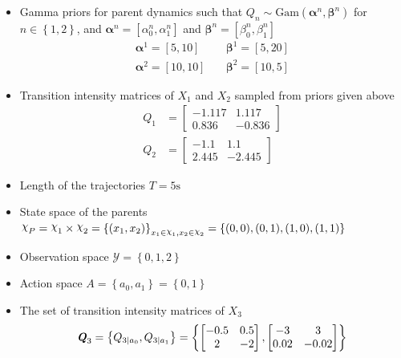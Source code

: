 \begin{itemize}
	\item Gamma priors for parent dynamics such that $ Q_{n} \sim \mathrm{Gam}(\boldsymbol{\alpha}^n, \boldsymbol{\beta}^n)$ for $n \in \left\lbrace 1,2\right\rbrace $, and $ \boldsymbol{\alpha}^n = [\alpha^n_0, \alpha^n_1] $ and $ \boldsymbol{\beta}^n = [\beta^n_0, \beta^n_1] $
	\begin{align}
	\boldsymbol{\alpha}^1 = [5,10] &\quad \boldsymbol{\beta}^1 = [5,20] \\
	\boldsymbol{\alpha}^2 = [10,10] &\quad \boldsymbol{\beta}^2 = [10,5]
	\label{eq:gamma_params}
	\end{align}
	\item Transition intensity matrices of $ X_1 $ and $ X_2 $ sampled from priors given above
	\begin{align}
	Q_1 &= 
	\begin{bmatrix}
	-1.117 & 1.117 \\
	0.836 &  -0.836
	\end{bmatrix} \\
	Q_2 &= 
	\begin{bmatrix}
	-1.1 & 1.1 \\
	2.445 &  -2.445
	\end{bmatrix}
	\end{align}
	\item Length of the trajectories $ T = 5\text{s} $
	\item State space of the parents $ \rchi_{P} = \rchi_1 \times \rchi_2 = \left\lbrace (x_1, x_2)\right\rbrace_{x_1\in \rchi_1, x_2\in \rchi_2} = \left\lbrace (0, 0), (0, 1), (1, 0),(1, 1)\right\rbrace $
	\item Observation space $ \mathcal{Y} = \left\lbrace 0, 1, 2 \right\rbrace $
	\item Action space $ \textit{A} = \left\lbrace a_{0}, a_{1} \right\rbrace = \left\lbrace 0, 1\right\rbrace $
	\item The set of transition intensity matrices of $ X_3 $
	\begin{align}
	\textbf{\textit{Q}}_3 = \left\lbrace Q_{3\mid a_{0}}, Q_{3\mid a_{1}} \right\rbrace = \left\lbrace 
	\begin{bmatrix}
	-0.5 & 0.5 \\
	2 &  -2
	\end{bmatrix}, 
	\begin{bmatrix}
	-3 & 3 \\
	0.02 &  -0.02
	\end{bmatrix} 
	\right\rbrace 
	\end{align}

\end{itemize}
